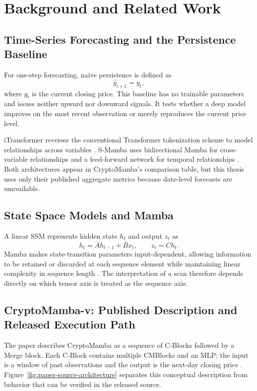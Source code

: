 \documentclass[13pt,a4paper,oneside]{report}
\begin{document}
\chapter{Background and Related Work}\label{chap:background}

\section{Time-Series Forecasting and the Persistence Baseline}\label{sec:persistence}
For one-step forecasting, naive persistence is defined as
\begin{equation}\label{eq:persistence}
\widehat{y}_{t+1}=y_t,
\end{equation}
where $y_t$ is the current closing price. This baseline has no trainable parameters and issues
neither upward nor downward signals. It tests whether a deep model improves on the most recent
observation or merely reproduces the current price level.

iTransformer reverses the conventional Transformer tokenization scheme to model relationships
across variables \cite{itransformer}. S-Mamba uses bidirectional Mamba for cross-variable
relationships and a feed-forward network for temporal relationships \cite{smamba}. Both
architectures appear in CryptoMamba's comparison table, but this thesis uses only their published
aggregate metrics because date-level forecasts are unavailable.

\section{State Space Models and Mamba}\label{sec:mamba}
A linear SSM represents hidden state $h_t$ and output $z_t$ as
\begin{equation}\label{eq:ssm}
h_t=\bar{A}h_{t-1}+\bar{B}x_t, \qquad z_t=Ch_t.
\end{equation}
Mamba makes state-transition parameters input-dependent, allowing information to be retained or
discarded at each sequence element while maintaining linear complexity in sequence length
\cite{mamba}. The interpretation of a scan therefore depends directly on which tensor axis is
treated as the sequence axis.

\section{CryptoMamba-v: Published Description and Released Execution Path}\label{sec:cmv}
The paper describes CryptoMamba as a sequence of C-Blocks followed by a Merge block. Each C-Block
contains multiple CMBlocks and an MLP; the input is a window of past observations and the output is
the next-day closing price \cite{cryptomamba}. Figure~\ref{fig:paper-source-architecture}
separates this conceptual description from behavior that can be verified in the released source.
\end{document}

